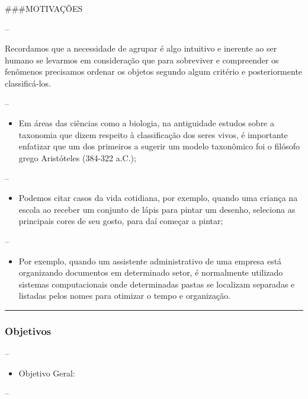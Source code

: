 \documentclass[
]{article}
\providecommand{\tightlist}{%
  \setlength{\itemsep}{0pt}\setlength{\parskip}{0pt}}
\begin{document}
\#\#\#MOTIVAÇÕES

--

Recordamos que a necessidade de agrupar é algo intuitivo e inerente ao
ser humano se levarmos em consideração que para sobreviver e compreender
os fenômenos precisamos ordenar os objetos segundo algum critério e
posteriormente classificá-los.

--

\begin{itemize}
\item
  Em áreas das ciências como a biologia, na antiguidade estudos sobre a
  taxonomia que dizem respeito à classificação dos seres vivos, é
  importante enfatizar que um dos primeiros a sugerir um modelo
  taxonômico foi o filósofo grego Aristóteles (384-322 a.C.);
\end{itemize}

--

\begin{itemize}
\item
  Podemos citar casos da vida cotidiana, por exemplo, quando uma criança
  na escola ao receber um conjunto de lápis para pintar um desenho,
  seleciona as principais cores de seu gosto, para daí começar a pintar;
\end{itemize}

--

\begin{itemize}
\item
  Por exemplo, quando um assistente administrativo de uma empresa está
  organizando documentos em determinado setor, é normalmente utilizado
  sistemas computacionais onde determinadas pastas se localizam
  separadas e listadas pelos nomes para otimizar o tempo e organização.
\end{itemize}

\begin{center}\rule{0.5\linewidth}{0.5pt}\end{center}

\hypertarget{objetivos}{%
\subsubsection{Objetivos}\label{objetivos}}

--

\begin{itemize}
\tightlist
\item
  Objetivo Geral:
\end{itemize}

--
\end{document}
